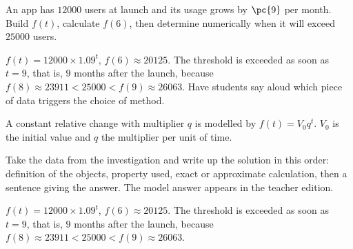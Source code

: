\begin{activity}
An app has $\num{12000}$ users at launch and its usage grows by $\pc{9}$ per month. Build $f(t)$, calculate $f(6)$, then determine numerically when it will exceed $\num{25000}$ users.
\begin{center}\end{center}
\end{activity}
\begin{solution}$f(t)=\num{12000}\times\num{1,09}^t$, $f(6)\approx\num{20125}$. The threshold is exceeded as soon as $t=9$, that is, $9$ months after the launch, because $f(8)\approx\num{23911}<\num{25000}<f(9)\approx\num{26063}$. Have students say aloud which piece of data triggers the choice of method.\end{solution}

\begin{summary}A constant relative change with multiplier $q$ is modelled by $f(t)=V_0q^t$. $V_0$ is the initial value and $q$ the multiplier per unit of time.\end{summary}

\begin{example}
Take the data from the investigation and write up the solution in this order: definition of the objects, property used, exact or approximate calculation, then a sentence giving the answer. The model answer appears in the teacher edition.
\end{example}
\begin{solution}$f(t)=\num{12000}\times\num{1,09}^t$, $f(6)\approx\num{20125}$. The threshold is exceeded as soon as $t=9$, that is, $9$ months after the launch, because $f(8)\approx\num{23911}<\num{25000}<f(9)\approx\num{26063}$.\end{solution}

